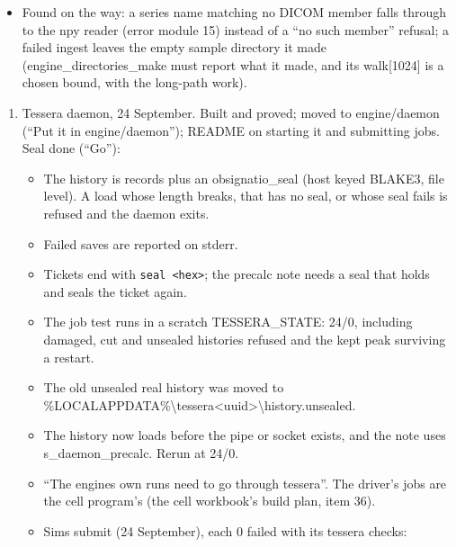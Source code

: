 \begin{itemize}
\item Found on the way: a series name matching no DICOM member falls through to the npy reader (error module 15) instead of a “no such member” refusal; a failed ingest leaves the empty sample directory it made (engine\_\allowbreak{}directories\_\allowbreak{}make must report what it made, and its walk[1024] is a chosen bound, with the long-path work).
\end{itemize}

\begin{enumerate}
\item Tessera daemon, 24 September. Built and proved; moved to engine/daemon (“Put it in engine/daemon”); README on starting it and submitting jobs. Seal done (“Go”):

\begin{itemize}
\item The history is records plus an obsignatio\_\allowbreak{}seal (host keyed BLAKE3, file level). A load whose length breaks, that has no seal, or whose seal fails is refused and the daemon exits.
\item Failed saves are reported on stderr.
\item Tickets end with \texttt{seal <hex>}; the precalc note needs a seal that holds and seals the ticket again.
\item The job test runs in a scratch TESSERA\_\allowbreak{}STATE: 24/0, including damaged, cut and unsealed histories refused and the kept peak surviving a restart.
\item The old unsealed real history was moved to \%LOCALAPPDATA\%\textbackslash{}tessera<uuid>\textbackslash{}history.unsealed.
\item The history now loads before the pipe or socket exists, and the note uses s\_\allowbreak{}daemon\_\allowbreak{}precalc. Rerun at 24/0.
\item “The engines own runs need to go through tessera”. The driver's jobs are the cell program's (the cell workbook's build plan, item 36).
\item Sims submit (24 September), each 0 failed with its tessera checks:


\end{itemize}
\end{enumerate}
